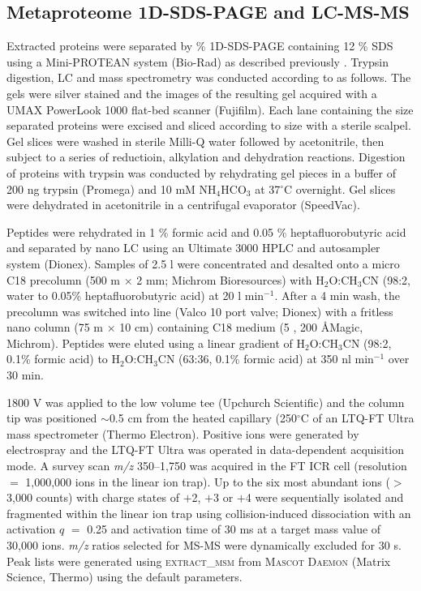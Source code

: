 \subsection{Metaproteome \acs{1D-SDS-PAGE} and \acs{LC}-\acs{MS-MS}}
Extracted proteins were separated by \% \ac{1D-SDS-PAGE} containing 12 \% SDS using a Mini-PROTEAN system (Bio-Rad) as described previously \cite{Saunders2006}.
Trypsin digestion, \ac{LC} and mass spectrometry was conducted according to \citet{Ng2010a} as follows.
The gels were silver stained and the images of the resulting gel acquired with a UMAX PowerLook 1000 flat-bed scanner (Fujifilm).
Each lane containing the size separated proteins were excised and sliced according to size with a sterile scalpel.
Gel slices were washed in sterile Milli-Q water followed by acetonitrile, then subject to a series of reductioin, alkylation and dehydration reactions.
Digestion of proteins with trypsin was conducted by rehydrating gel pieces in a buffer of 200 ng trypsin (Promega) and 10 mM NH$_4$HCO$_3$ at 37$^{\circ}$C overnight. 
Gel slices were dehydrated in acetonitrile in a centrifugal evaporator (SpeedVac).

Peptides were rehydrated in 1 \% formic acid and 0.05 \% heptafluorobutyric acid and separated by nano \ac{LC} using an Ultimate 3000 \acs{HPLC} and autosampler system (Dionex).
Samples of 2.5 \textmu{}l were concentrated and desalted onto a micro C18 precolumn (500 \textmu{}m $\times$ 2 mm; Michrom Bioresources) with H$_2$O:CH$_3$CN (98:2, water to 0.05\% heptafluorobutyric acid) at 20 \textmu{}l min$^{-1}$.
After a 4 min wash, the precolumn was switched into line (Valco 10 port valve; Dionex) with a fritless nano column (75 \textmu{}m $\times$ 10 cm) containing C18 medium (5 \textmu{}, 200 \AA Magic, Michrom).
Peptides were eluted using a linear gradient of H$_2$O:CH$_3$CN (98:2, 0.1\% formic acid) to H$_2$O:CH$_3$CN (63:36, 0.1\% formic acid) at 350 nl min$^{-1}$ over 30 min.

1800 V was applied to the low volume tee (Upchurch Scientific) and the column tip was positioned $\sim$0.5 cm from the heated capillary (250$^{\circ}$C of an LTQ-FT Ultra mass spectrometer (Thermo Electron).
Positive ions were generated by electrospray and the LTQ-FT Ultra was operated in data-dependent acquisition mode.
A survey scan \emph{m/z} 350--1,750 was acquired in the FT ICR cell (resolution $=$ 1,000,000 ions in the linear ion trap).
Up to the six most abundant ions ($>$3,000 counts) with charge states of $+$2, $+$3 or $+$4 were sequentially isolated and fragmented within the linear ion trap using collision-induced dissociation with an activation $q$ $=$ 0.25 and activation time of 30 ms at a target mass value of 30,000 ions.
\emph{m/z} ratios selected for \ac{MS-MS} were dynamically excluded for 30 s.
Peak lists were generated using \textsc{extract\_msm} from \textsc{Mascot Daemon} (Matrix Science, Thermo) using the default parameters.

